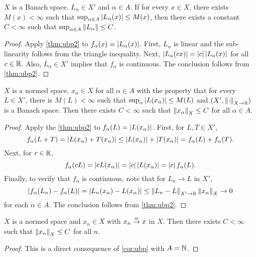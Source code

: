 \begin{corollary}
    $X$ is a Banach space. $L_\alpha\in X'$ and $\alpha\in A$. 
    If for every $x\in X$, there exists $M(x)<\infty$ such that 
    $\sup_{\alpha\in A}\left\lvert {L_\alpha(x)} \right\rvert\leq M(x)$, then there 
    exists a constant $C<\infty$ such that $\sup_{\alpha\in A}
    \left\lVert {L_\alpha} \right\rVert\leq C$.
\end{corollary}
\begin{proof}
    Apply \cref{thm:ubp2} to $f_\alpha(x) = \left\lvert {L_\alpha(x)} \right\rvert$. First,
    $L_\alpha$ is linear and the sub-linearity follows from the triangle 
    inequality. Next, $\left\lvert {L_\alpha(cx)} \right\rvert = \left\lvert {c} \right\rvert\left\lvert {L_\alpha(x)} \right\rvert$ for 
    all $c\in\mathbb{R}$. Also, $L_\alpha\in X'$ implies that $f_\alpha$ is 
    continuous. The conclusion follows from \cref{thm:ubp2}.
\end{proof}

\begin{corollary}\label{cor:ubp}
    $X$ is a normed space. $x_\alpha\in X$ for all $\alpha\in A$ with 
    the property that for every $L\in X'$, there is $M(L)<\infty$ 
    such that $\sup_\alpha \left\lvert {L(x_\alpha)} \right\rvert\leq M(L)$ and 
    $(X',\left\lVert {\cdot} \right\rVert_{X\to\mathbb{R}})$ is a Banach space. Then there exists 
    $C<\infty$ such that $\left\lVert {x_\alpha} \right\rVert_X\leq C$ for all $\alpha\in A$.
\end{corollary}
\begin{proof}
    Apply the \cref{thm:ubp2} to $f_\alpha(L) = \left\lvert {L(x_\alpha)} \right\rvert$. First, 
    for $L,T\in X'$, 
    \begin{equation*}
        f_\alpha(L+T) = \left\lvert {L(x_\alpha)+T(x_\alpha)} \right\rvert 
        \leq \left\lvert {L(x_\alpha)} \right\rvert + \left\lvert {T(x_\alpha)} \right\rvert 
        = f_\alpha(L) + f_\alpha(T).
    \end{equation*}
    Next, for $c\in\mathbb{R}$, 
    \begin{equation*}
        f_\alpha(cL) = \left\lvert {cL(x_\alpha)} \right\rvert = \left\lvert {c} \right\rvert\left\lvert {L(x_\alpha)} \right\rvert 
        = \left\lvert {c} \right\rvert f_\alpha(L).
    \end{equation*}
    Finally, to verify that $f_\alpha$ is continuous, note that for 
    $L_n\to L$ in $X'$, 
    \begin{equation*}
        \left\lvert {f_\alpha(L_n) - f_\alpha(L)} \right\rvert = \left\lvert {L_n(x_\alpha) - L(x_\alpha)} \right\rvert 
        \leq \left\lVert {L_n-L} \right\rVert_{X'\to\mathbb{R}}\left\lVert {x_\alpha} \right\rVert_X\to 0
    \end{equation*}
    for each $\alpha\in A$. The conclusion follows from \cref{thm:ubp2}.
\end{proof}

\begin{corollary}\label{cor:ubp2}
    $X$ is a normed space and $x_n\in X$ with $x_n\overset{w}{\to} x$ in $X$. 
    Then there exists $C<\infty$ such that $\left\lVert {x_n} \right\rVert_X\leq C$ for all $n$. 
\end{corollary}
\begin{proof}
    This is a direct consequence of \cref{cor:ubp} with $A = \mathbb{N}$.
\end{proof}

